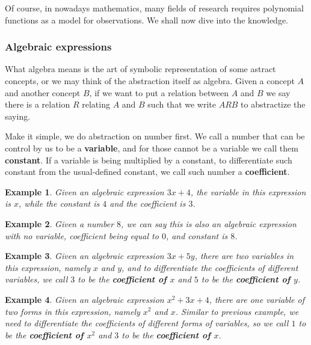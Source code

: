 \documentclass[12pt]{article}
\newtheorem*{example}{Example}
\begin{document}
    Of course, in nowadays mathematics, many fields of research requires polynomial functions as a model for observations. We shall now dive into the knowledge.
    \subsubsection*{Algebraic expressions}

    What algebra means is the art of symbolic representation of some astract concepts, or we may think of the abstraction itself as algebra. Given a concept $A$ and another concept $B$, if we want to put a relation between $A$ and $B$ we say there is a relation $R$ relating $A$ and $B$ such that we write $ARB$ to abstractize the saying.
    
    Make it simple, we do abstraction on number first. We call a number that can be control by us to be a \textbf{variable}, and for those cannot be a variable we call them \textbf{constant}. If a variable is being multiplied by a constant, to differentiate such constant from the usual-defined constant, we call such number a \textbf{coefficient}.

    \begin{example}
        Given an algebraic expression $3x+4$, the variable in this expression is $x$, while the constant is $4$ and the coefficient is $3$.
    \end{example}

    \begin{example}
        Given a number $8$, we can say this is also an algebraic expression with no variable, coefficient being equal to $0$, and constant is $8$.
    \end{example}

    \begin{example}
        Given an algebraic expression $3x+5y$, there are two variables in this expression, namely $x$ and $y$, and to differentiate the coefficients of different variables, we call $3$ to be the \textbf{coefficient of $x$} and $5$ to be the \textbf{coefficient of $y$}.
    \end{example}

    \begin{example}
        Given an algebraic expression $x^2+3x+4$, there are one variable of two forms in this expression, namely $x^2$ and $x$. Similar to previous example, we need to differentiate the coefficients of different forms of variables, so we call $1$ to be the \textbf{coefficient of $x^2$} and $3$ to be the \textbf{coefficient of $x$}.
    \end{example}
\end{document}
